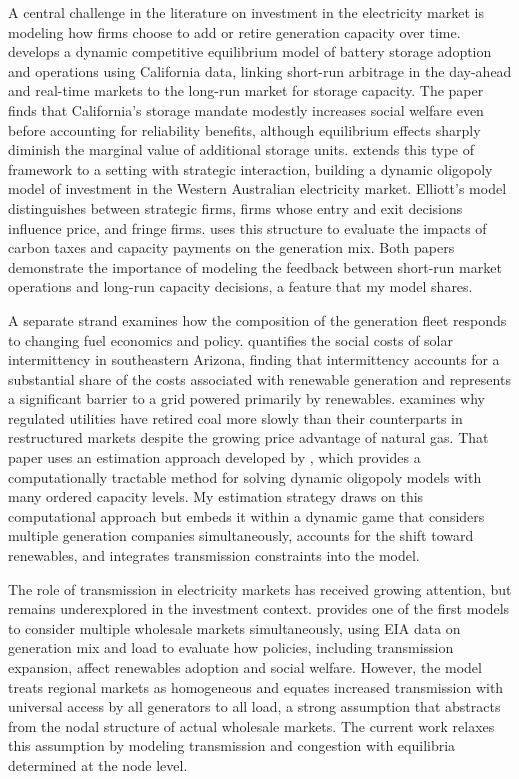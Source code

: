 \documentclass[12pt]{article}
\begin{document}
A central challenge in the literature on investment in the electricity market is modeling how firms choose to add or retire generation capacity over time. \cite{butters2021soaking} develops a dynamic competitive equilibrium model of battery storage adoption and operations using California data, linking short-run arbitrage in the day-ahead and real-time markets to the long-run market for storage capacity. The paper finds that California's storage mandate modestly increases social welfare even before accounting for reliability benefits, although equilibrium effects sharply diminish the marginal value of additional storage units. \cite{elliott2022investment} extends this type of framework to a setting with strategic interaction, building a dynamic oligopoly model of investment in the Western Australian electricity market. Elliott's model distinguishes between strategic firms, firms whose entry and exit decisions influence price, and fringe firms. \cite{elliott2022investment} uses this structure to evaluate the impacts of carbon taxes and capacity payments on the generation mix. Both papers demonstrate the importance of modeling the feedback between short-run market operations and long-run capacity decisions, a feature that my model shares.
 
A separate strand examines how the composition of the generation fleet responds to changing fuel economics and policy. \cite{gowrisankaran2016intermittency} quantifies the social costs of solar intermittency in southeastern Arizona, finding that intermittency accounts for a substantial share of the costs associated with renewable generation and represents a significant barrier to a grid powered primarily by renewables. \cite{gowrisankaran2024energy} examines why regulated utilities have retired coal more slowly than their counterparts in restructured markets despite the growing price advantage of natural gas. That paper uses an estimation approach developed by \cite{gowrisankaran2024computable}, which provides a computationally tractable method for solving dynamic oligopoly models with many ordered capacity levels. My estimation strategy draws on this computational approach but embeds it within a dynamic game that considers multiple generation companies simultaneously, accounts for the shift toward renewables, and integrates transmission constraints into the model.
 
The role of transmission in electricity markets has received growing attention, but remains underexplored in the investment context. \cite{holland2022decarbonization} provides one of the first models to consider multiple wholesale markets simultaneously, using EIA data on generation mix and load to evaluate how policies, including transmission expansion, affect renewables adoption and social welfare. However, the model treats regional markets as homogeneous and equates increased transmission with universal access by all generators to all load, a strong assumption that abstracts from the nodal structure of actual wholesale markets. The current work relaxes this assumption by modeling transmission and congestion with equilibria determined at the node level.
 
\end{document}
